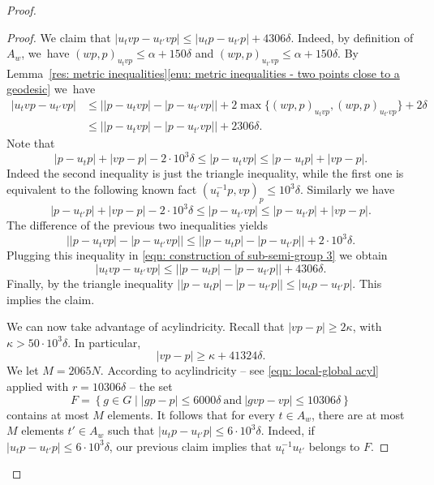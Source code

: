 \documentclass[11pt]{article}
\theoremstyle{plain}
\theoremstyle{definition}
\begin{document}
\begin{proof}
\begin{proof}
We claim that $|u_tvp - u_{t'}vp| \leq |u_tp -u_{t'}p| +4306\delta$.
Indeed, by definition of $A_w$, we~have $(wp,p)_{u_tvp} \leq \alpha + 150\delta$ and $(wp,p)_{u_{t'}vp} \leq \alpha + 150\delta$.
By Lemma~\ref{res: metric inequalities}\eqref{enu: metric inequalities - two points close to a geodesic} we~have%
\begin{equation}
\label{eqn: construction of sub-semi-group 3}
\begin{split}
|u_tvp - u_{t'}vp|
& \leq \bigl||p - u_tvp| \!-\! |p-u_{t'}vp|\bigr| \!+\! 2 \max\{ (wp,p)_{u_tvp}, (wp,p)_{u_{t'}vp}\} \!+\! 2\delta \\
& \leq \bigl||p - u_tvp| \!-\! |p-u_{t'}vp|\bigr| \!+\! 2306\delta.
\end{split}
\end{equation}
Note that
\begin{equation*}
|p-u_tp| +|vp-p| - 2\cdot 10^3\delta \leq |p - u_tvp|\leq |p-u_tp| +|vp-p|.
\end{equation*}
Indeed the second inequality is just the triangle inequality, while the first one is equivalent to the following known fact $(u_t^{-1}p,vp)_p\leqslant 10^3\delta$.
Similarly we have
\begin{equation*}
|p-u_{t'}p| +|vp-p| - 2\cdot 10^3\delta \leq |p - u_{t'}vp|\leq |p-u_{t'}p| +|vp-p|.
\end{equation*}
The difference of the previous two inequalities yields
\begin{equation*}
\bigl||p - u_tvp| - |p-u_{t'}vp|\bigr| \leq \bigl| |p - u_tp| - |p - u_{t'}p|\bigr| + 2\cdot 10^3\delta.
\end{equation*}
Plugging this inequality in \eqref{eqn: construction of sub-semi-group 3} we obtain
\begin{equation*}
|u_tvp - u_{t'}vp| \leq \bigl| |p - u_tp| - |p - u_{t'}p|\bigr| + 4306 \delta.
\end{equation*}
Finally, by the triangle inequality
$
\bigl | |p - u_tp| - |p - u_{t'}p|\bigr| \leq |u_tp-u_{t'}p| .
$
This implies the claim.

We can now take advantage of acylindricity.
Recall that $|vp - p| \geq 2\kappa$, with $\kappa > 50 \cdot 10^3\delta$.
In particular,
\begin{equation*}
|vp - p| \geq \kappa + 41324\delta.
\end{equation*}
We let $M = 2065N$.
According to acylindricity -- see \eqref{eqn: local-global acyl} applied with $r = 10306\delta$ -- the set
\begin{equation*}
F = \left\{ g \in G \mid |gp - p| \leq 6000\delta\ \text{and} \ |gvp - vp| \leq 10306\delta \right\}
\end{equation*}
contains at most $M$ elements.
It follows that for every $t \in A_w$, there are at most $M$ elements $t' \in A_w$ such that $|u_tp - u_{t'}p| \leq 6\cdot 10^3\delta$.
Indeed, if $|u_tp - u_{t'}p| \leq 6\cdot 10^3\delta$, our previous claim implies that $u_t^{-1}u_{t'}$ belongs to $F$.


\end{proof}
\end{proof}
\end{document}

